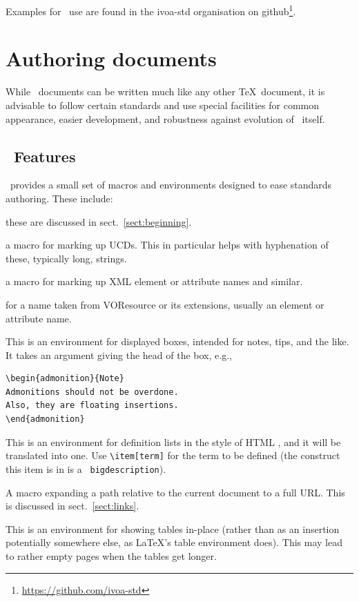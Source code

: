 \documentclass[11pt,a4paper]{ivoa}
\newcommand{\texword}[1]{\texttt{\color{texcolor} #1}}
\begin{document}
Examples for \ivoatex\ use are found in the ivoa-std organisation on
github\footnote{\url{https://github.com/ivoa-std}}.


\section{Authoring documents}
\label{sect:authoring}

While \ivoatex\ documents can be written much like any other \TeX\
document, it is advisable to follow certain standards and use special
facilities for common appearance, easier development, and robustness
against evolution of \ivoatex\ itself.

\subsection{\ivoatex\ Features}

\ivoatex\ provides a small set of macros and environments designed
to ease standards authoring.  These include:

\begin{bigdescription}
\item[\texword{author}, \texword{previousversion}, \texword{ivoagroup}] these are discussed
in sect.~\ref{sect:beginning}.
\item[\texword{ucd}] a macro for marking up UCDs.  This in particular
helps with hyphenation of these, typically long, strings.
\item[\texword{xmlel}] a macro for marking up XML element or attribute
names and similar.
\item[\texword{vorent}] for a name taken from VOResource or its
extensions, usually an
element or attribute name.
\item[\texword{admonition}] This is an environment for
displayed boxes, intended for notes, tips, and the like.
It takes an argument giving the head of the box, e.g.,

\begin{lstlisting}
\begin{admonition}{Note}
Admonitions should not be overdone.
Also, they are floating insertions.
\end{admonition}
\end{lstlisting}
\item[\texword{bigdescription}] This is an environment for definition
lists in the style of HTML \xmlel{dl}, and it will be translated into
one.  Use \verb|\item[term]| for the term to be defined
(the construct this item is in is a \texword{bigdescription}).
\item[\texword{auxilaryurl}] A macro expanding a path relative to the
current document to a full URL.  This is discussed in
sect.~\ref{sect:links}.
\item[\texword{inlinetable}] This is an environment for showing tables
in-place (rather than as an insertion potentially somewhere else, as
LaTeX's table environment does).  This may lead to rather empty pages
when the tables get longer.
\end{bigdescription}
\end{document}
